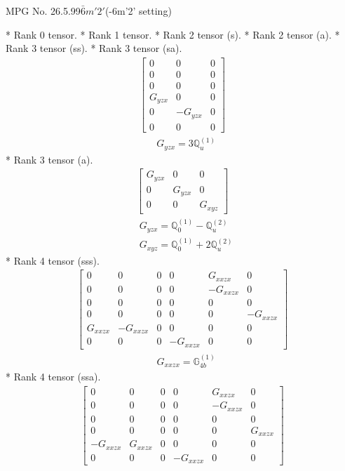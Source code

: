 \documentclass[fleqn,8pt,landscape]{jsarticle}
\begin{document}
\setcounter{MaxMatrixCols}{32}

\renewcommand{\tablename}{Table~}
\renewcommand{\figurename}{Figure~}
\begin{center}
\LARGE
MPG No. 26.5.99\quad$\bar{6}m'2'$\quad(-6m'2' setting)
\end{center}
* Rank 0 tensor.
* Rank 1 tensor.
* Rank 2 tensor (s).
* Rank 2 tensor (a).
* Rank 3 tensor (ss).
* Rank 3 tensor (sa).
\begin{align*}
\begin{bmatrix} 0 & 0 & 0 \\ 0 & 0 & 0 \\ 0 & 0 & 0 \\ G_{yzx} & 0 & 0 \\ 0 & - G_{yzx} & 0 \\ 0 & 0 & 0 \end{bmatrix}
\end{align*}
\begin{align*}
& G_{yzx} = 3 \mathbb{Q}_{u}^{(1)}
\end{align*}
* Rank 3 tensor (a).
\begin{align*}
\begin{bmatrix} G_{yzx} & 0 & 0 \\ 0 & G_{yzx} & 0 \\ 0 & 0 & G_{xyz} \end{bmatrix}
\end{align*}
\begin{align*}
& G_{yzx} = \mathbb{Q}_{0}^{(1)} - \mathbb{Q}_{u}^{(2)} \\
& G_{xyz} = \mathbb{Q}_{0}^{(1)} + 2 \mathbb{Q}_{u}^{(2)}
\end{align*}
* Rank 4 tensor (sss).
\begin{align*}
\begin{bmatrix} 0 & 0 & 0 & 0 & G_{xxzx} & 0 \\ 0 & 0 & 0 & 0 & - G_{xxzx} & 0 \\ 0 & 0 & 0 & 0 & 0 & 0 \\ 0 & 0 & 0 & 0 & 0 & - G_{xxzx} \\ G_{xxzx} & - G_{xxzx} & 0 & 0 & 0 & 0 \\ 0 & 0 & 0 & - G_{xxzx} & 0 & 0 \end{bmatrix}
\end{align*}
\begin{align*}
& G_{xxzx} = \mathbb{G}_{4b}^{(1)}
\end{align*}
* Rank 4 tensor (ssa).
\begin{align*}
\begin{bmatrix} 0 & 0 & 0 & 0 & G_{xxzx} & 0 \\ 0 & 0 & 0 & 0 & - G_{xxzx} & 0 \\ 0 & 0 & 0 & 0 & 0 & 0 \\ 0 & 0 & 0 & 0 & 0 & G_{xxzx} \\ - G_{xxzx} & G_{xxzx} & 0 & 0 & 0 & 0 \\ 0 & 0 & 0 & - G_{xxzx} & 0 & 0 \end{bmatrix}
\end{align*}
\end{document}
